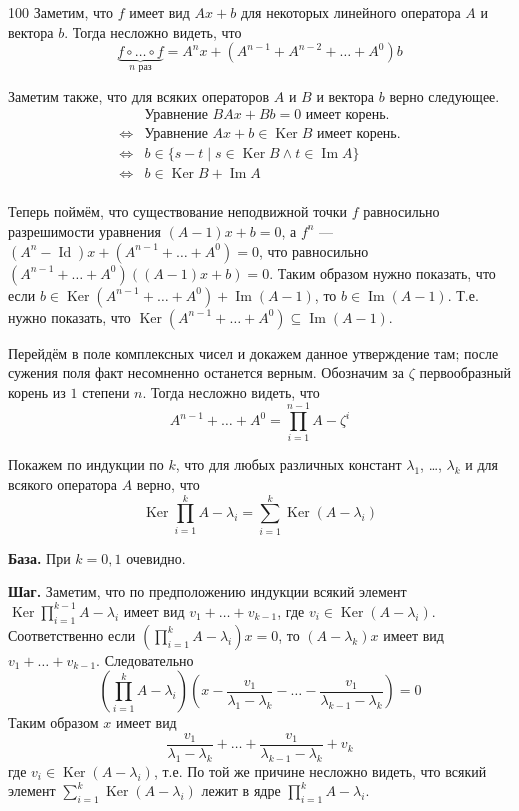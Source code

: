 \documentclass[12pt,a4paper]{article}
\DeclareMathOperator{\Img}{Im}
\DeclareMathOperator{\Ker}{Ker}
\DeclareMathOperator{\Id}{Id}
\begin{document}
    \begin{problem}{100}
        Заметим, что $f$ имеет вид $Ax + b$ для некоторых линейного оператора $A$ и вектора $b$. Тогда несложно видеть, что
        \[\underbrace{f \circ \dots \circ f}_\text{$n$ раз} = A^n x + (A^{n-1} + A^{n-2} + \dots + A^0) b\]

        Заметим также, что для всяких операторов $A$ и $B$ и вектора $b$ верно следующее.
        \begin{align*}
            &\text{Уравнение $BAx + Bb = 0$ имеет корень.}\\
            \Longleftrightarrow&\text{Уравнение $Ax + b \in \Ker B$ имеет корень.}\\
            \Longleftrightarrow&b \in \{s - t \mid s \in \Ker B \wedge t \in \Img A\}\\
            \Longleftrightarrow&b \in \Ker B + \Img A\\
        \end{align*}

        Теперь поймём, что существование неподвижной точки $f$ равносильно разрешимости уравнения $(A-1)x + b = 0$, а $f^n$ --- $(A^n - \Id)x + (A^{n-1} + \dots + A^0) = 0$, что равносильно $(A^{n-1} + \dots + A^0)((A-1)x + b) = 0$. Таким образом нужно показать, что если $b \in \Ker(A^{n-1} + \dots + A^0) + \Img(A-1)$, то $b \in \Img(A-1)$. Т.е. нужно показать, что $\Ker(A^{n-1} + \dots + A^0) \subseteq \Img(A-1)$.
        
        Перейдём в поле комплексных чисел и докажем данное утверждение там; после сужения поля факт несомненно останется верным. Обозначим за $\zeta$ первообразный корень из $1$ степени $n$. Тогда несложно видеть, что
        \[A^{n-1} + \dots + A^0 = \prod_{i=1}^{n-1} A - \zeta^i\]

        Покажем по индукции по $k$, что для любых различных констант $\lambda_1$, \dots, $\lambda_k$ и для всякого оператора $A$ верно, что
        \[\Ker \prod_{i=1}^k A - \lambda_i = \sum_{i=1}^k \Ker(A - \lambda_i)\]

        {\bfseries База.} При $k = 0, 1$ очевидно.

        {\bfseries Шаг.} Заметим, что по предположению индукции всякий элемент $\Ker\prod_{i=1}^{k-1} A - \lambda_i$ имеет вид $v_1 + \dots + v_{k-1}$, где $v_i \in \Ker(A - \lambda_i)$. Соответственно если $(\prod_{i=1}^k A - \lambda_i) x = 0$, то $(A - \lambda_k)x$ имеет вид $v_1 + \dots + v_{k-1}$. Следовательно
        \[\left(\prod_{i=1}^k A - \lambda_i \right)\left(x - \frac{v_1}{\lambda_1 - \lambda_k} - \dots - \frac{v_1}{\lambda_{k-1} - \lambda_k}\right) = 0\]
        Таким образом $x$ имеет вид
        \[\frac{v_1}{\lambda_1 - \lambda_k} + \dots + \frac{v_1}{\lambda_{k-1} - \lambda_k} + v_k\]
        где $v_i \in \Ker(A - \lambda_i)$, т.е.
        По той же причине несложно видеть, что всякий элемент $\sum_{i=1}^k \Ker(A - \lambda_i)$ лежит в ядре $\prod_{i=1}^k A - \lambda_i$.


\end{problem}
\end{document}
